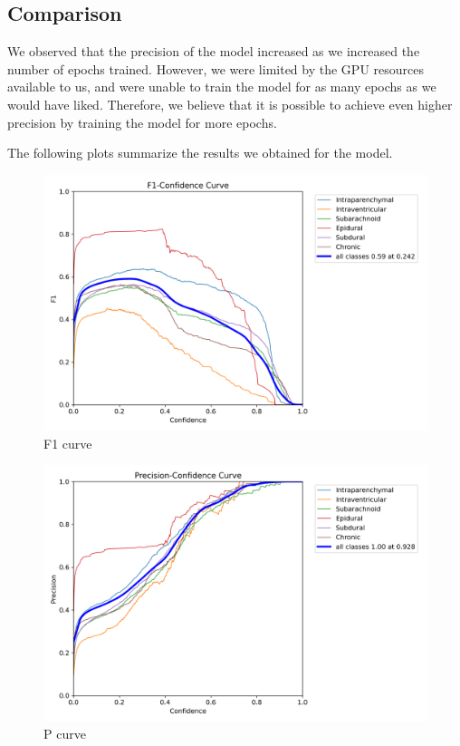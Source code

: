 \documentclass[Print]{../Style/isecure-v24}
\begin{document}
\subsection{Comparison} \label{sec: comparison}
We observed that the precision of the  model increased as we increased the number of epochs trained. However, we were limited by the GPU resources available to us, and were unable to train the model for as many epochs as we would have liked. Therefore, we believe that it is possible to achieve even higher precision by training the model for more epochs.

The following plots summarize the results we obtained for the model.

{\begin{figure}[h]
    \centering
    \includegraphics[width=1.0\linewidth]{ISeCure Draft/Images/F1_curve.png}
    \captionsetup{font=small}
    \caption{F1 curve}
    \label{fig:f1}
\end{figure}}

{\begin{figure}[h]
    \centering
    \includegraphics[width=1.0\linewidth]{ISeCure Draft/Images/P_curve.png}
    \captionsetup{font=small}
    \caption{P curve}
    \label{fig:p}
\end{figure}}
\end{document}
